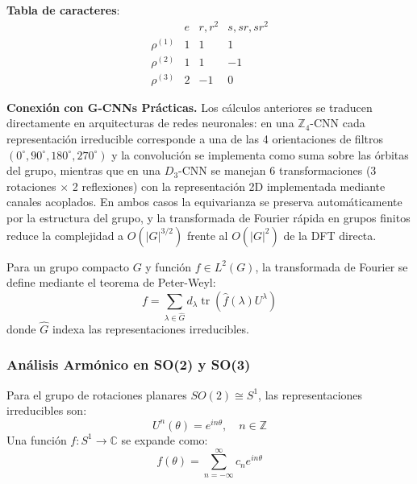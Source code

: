 \begin{example}
\textbf{Tabla de caracteres}:
\begin{equation}
\begin{array}{c|ccc}
 & e & r, r^2 & s, sr, sr^2 \\
\hline
\rho^{(1)} & 1 & 1 & 1 \\
\rho^{(2)} & 1 & 1 & -1 \\
\rho^{(3)} & 2 & -1 & 0
\end{array}
\end{equation}
\end{example}

\textbf{Conexión con G-CNNs Prácticas.} Los cálculos anteriores se traducen directamente en arquitecturas de redes neuronales: en una $\mathbb{Z}_4$-CNN cada representación irreducible corresponde a una de las 4 orientaciones de filtros $(0^\circ, 90^\circ, 180^\circ, 270^\circ)$ y la convolución se implementa como suma sobre las órbitas del grupo, mientras que en una $D_3$-CNN se manejan 6 transformaciones (3 rotaciones $\times$ 2 reflexiones) con la representación 2D implementada mediante canales acoplados. En ambos casos la equivarianza se preserva automáticamente por la estructura del grupo, y la transformada de Fourier rápida en grupos finitos reduce la complejidad a $O(|G|^{3/2})$ frente al $O(|G|^2)$ de la DFT directa.

\begin{definition}\label{def:fourier_grupos_compactos}
Para un grupo compacto $G$ y función $f \in L^2(G)$, la transformada de Fourier se define mediante el teorema de Peter-Weyl:
\begin{equation}
f = \sum_{\lambda \in \widehat{G}} d_\lambda \operatorname{tr}(\hat{f}(\lambda) U^\lambda)
\end{equation}
donde $\widehat{G}$ indexa las representaciones irreducibles.
\end{definition}

\subsubsection{Análisis Armónico en SO(2) y SO(3)}

\begin{definition}\label{def:armonicos_circulares}
Para el grupo de rotaciones planares $SO(2) \cong S^1$, las representaciones irreducibles son:
\begin{equation}
U^n(\theta) = e^{in\theta}, \quad n \in \mathbb{Z}
\end{equation}
Una función $f: S^1 \to \mathbb{C}$ se expande como:
\begin{equation}
f(\theta) = \sum_{n=-\infty}^{\infty} c_n e^{in\theta}
\end{equation}
\end{definition}

